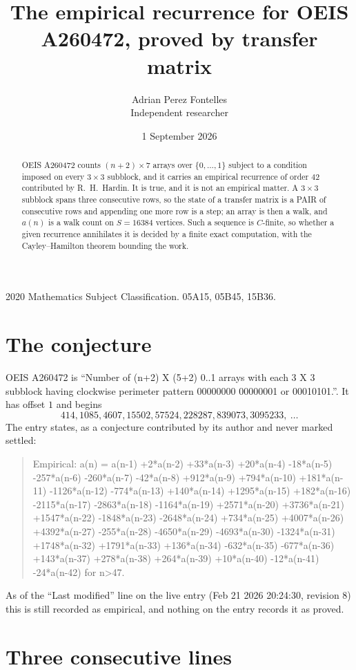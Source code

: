 \documentclass[11pt,a4paper]{article}
\title{The empirical recurrence for OEIS A260472, proved by transfer matrix}
\author{Adrian Perez Fontelles\\ \small Independent researcher}
\date{1 September 2026}
\theoremstyle{plain}
\theoremstyle{definition}
\begin{document}
\maketitle

\begin{abstract}
OEIS A260472 counts $(n+2)\times7$ arrays over $\{0,\dots,1\}$ subject to a condition imposed on
every $3\times3$ subblock, and it carries an empirical recurrence of order $42$
contributed by R.~H.~Hardin. It is true, and it is not an empirical matter. A $3\times3$
subblock spans three consecutive rows, so the state of a transfer matrix is a PAIR of
consecutive rows and appending one more row is a step; an array is then a walk, and
$a(n)$ is a walk count on $S=16384$ vertices. Such a sequence is $C$-finite, so whether a given
recurrence annihilates it is decided by a finite exact computation, with the Cayley--Hamilton
theorem bounding the work.
\end{abstract}

\noindent\small 2020 Mathematics Subject Classification. 05A15, 05B45, 15B36.\normalsize

\section{The conjecture}

OEIS A260472 is ``Number of (n+2) X (5+2) 0..1 arrays with each 3 X 3 subblock having clockwise perimeter pattern 00000000 00000001 or 00010101.''. It has offset $1$ and begins
\[
414, 1085, 4607, 15502, 57524, 228287, 839073, 3095233,\ \dots
\]
The entry states, as a conjecture contributed by its author and never marked settled:
\begin{quote}
Empirical: a(n) = a(n-1) +2*a(n-2) +33*a(n-3) +20*a(n-4) -18*a(n-5) -257*a(n-6) -260*a(n-7) -42*a(n-8) +912*a(n-9) +794*a(n-10) +181*a(n-11) -1126*a(n-12) -774*a(n-13) +140*a(n-14) +1295*a(n-15) +182*a(n-16) -2115*a(n-17) -2863*a(n-18) -1164*a(n-19) +2571*a(n-20) +3736*a(n-21) +1547*a(n-22) -1848*a(n-23) -2648*a(n-24) +734*a(n-25) +4007*a(n-26) +4392*a(n-27) -255*a(n-28) -4650*a(n-29) -4693*a(n-30) -1324*a(n-31) +1748*a(n-32) +1791*a(n-33) +136*a(n-34) -632*a(n-35) -677*a(n-36) +143*a(n-37) +278*a(n-38) +264*a(n-39) +10*a(n-40) -12*a(n-41) -24*a(n-42) for n>47.
\end{quote}
As of the ``Last modified'' line on the live entry (Feb 21 2026 20:24:30, revision 8) this is still
recorded as empirical, and nothing on the entry records it as proved.

\section{Three consecutive lines}
\end{document}
